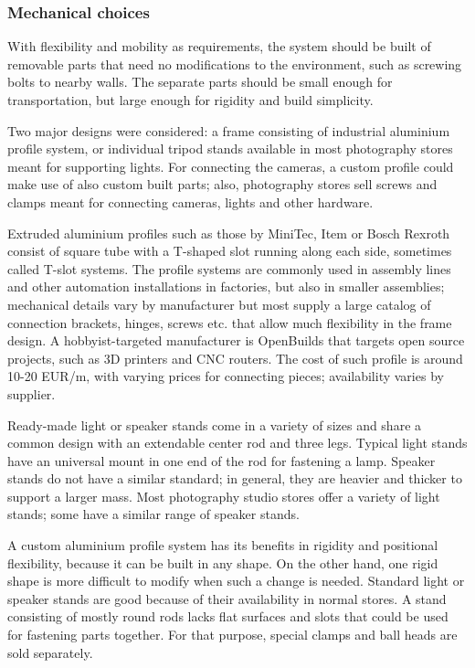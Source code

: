 \subsubsection{Mechanical choices}

With flexibility and mobility as requirements, the system should be built of removable parts that need no modifications to the environment, such as screwing bolts to nearby walls.
The separate parts should be small enough for transportation, but large enough for rigidity and build simplicity.

Two major designs were considered: a frame consisting of industrial aluminium profile system, or individual tripod stands available in most photography stores meant for supporting lights.
For connecting the cameras, a custom profile could make use of also custom built parts; also, photography stores sell screws and clamps meant for connecting cameras, lights and other hardware.

Extruded aluminium profiles such as those by MiniTec, Item or Bosch Rexroth consist of square tube with a T-shaped slot running along each side, sometimes called T-slot systems.
The profile systems are commonly used in assembly lines and other automation installations in factories, but also in smaller assemblies; mechanical details vary by manufacturer but most supply a large catalog of connection brackets, hinges, screws etc. that allow much flexibility in the frame design.
A hobbyist-targeted manufacturer is OpenBuilds that targets open source projects, such as 3D printers and CNC routers.
The cost of such profile is around 10-20 EUR/m, with varying prices for connecting pieces; availability varies by supplier.

Ready-made light or speaker stands come in a variety of sizes and share a common design with an extendable center rod and three legs.
Typical light stands have an universal mount in one end of the rod for fastening a lamp.
Speaker stands do not have a similar standard; in general, they are heavier and thicker to support a larger mass.
Most photography studio stores offer a variety of light stands; some have a similar range of speaker stands.

A custom aluminium profile system has its benefits in rigidity and positional flexibility, because it can be built in any shape.
On the other hand, one rigid shape is more difficult to modify when such a change is needed.
Standard light or speaker stands are good because of their availability in normal stores.
A stand consisting of mostly round rods lacks flat surfaces and slots that could be used for fastening parts together.
For that purpose, special clamps and ball heads are sold separately.

